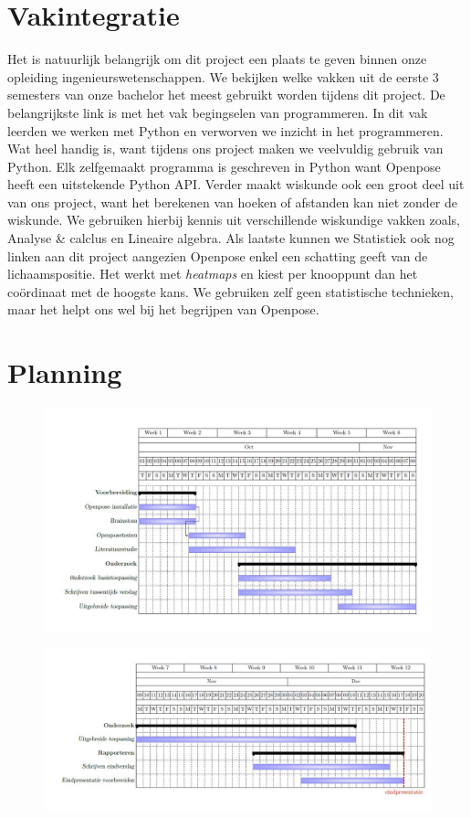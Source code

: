\documentclass[a4paper,twoside,kulak]{kulakreport}
\begin{document}
\chapter{Vakintegratie}
Het is natuurlijk belangrijk om dit project een plaats te geven binnen onze opleiding ingenieurswetenschappen. We bekijken welke vakken uit de eerste 3 semesters van onze bachelor het meest gebruikt worden tijdens dit project. De belangrijkste link is met het vak begingselen van programmeren. In dit vak leerden we werken met Python en verworven we inzicht in het programmeren. Wat heel handig is, want tijdens ons project maken we veelvuldig gebruik van Python. Elk zelfgemaakt programma is geschreven in Python want Openpose heeft een uitstekende Python API. Verder maakt wiskunde ook een groot deel uit van ons project, want het berekenen van hoeken of afstanden kan niet zonder de wiskunde. We gebruiken hierbij kennis uit verschillende wiskundige vakken zoals, Analyse \& calclus en Lineaire algebra. Als laatste kunnen we Statistiek ook nog linken aan dit project aangezien Openpose enkel een schatting geeft van de lichaamspositie. Het werkt met \textit{heatmaps} en kiest per knooppunt dan het coördinaat met de hoogste kans. We gebruiken zelf geen statistische technieken, maar het helpt ons wel bij het begrijpen van Openpose.

\chapter{Planning}

\begin{landscape}
	\begin{figure}
		\includegraphics[width= 2\textwidth]{ganttchart_1}
	\end{figure}
	\begin{figure}
		\includegraphics[width= 2\textwidth]{ganttchart_2}
	\end{figure}
\end{landscape}







\end{document}
